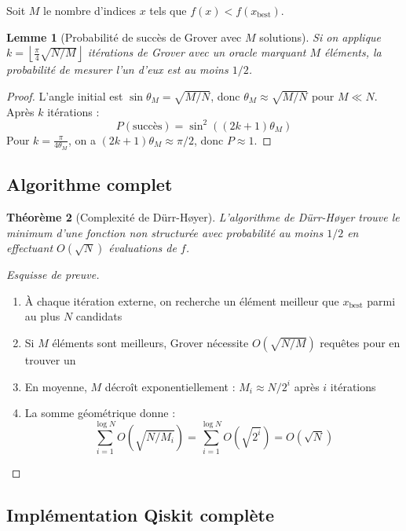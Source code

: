 \documentclass[12pt,a4paper]{article}
\newtheorem{theorem}{Théorème}[section]
\newtheorem{lemma}[theorem]{Lemme}
\theoremstyle{definition}
\theoremstyle{remark}
\begin{document}
Soit $M$ le nombre d'indices $x$ tels que $f(x) < f(x_{\text{best}})$.

\begin{lemma}[Probabilité de succès de Grover avec $M$ solutions]
Si on applique $k = \left\lfloor \frac{\pi}{4}\sqrt{N/M} \right\rfloor$ itérations de Grover avec un oracle marquant $M$ éléments, la probabilité de mesurer l'un d'eux est au moins $1/2$.
\end{lemma}

\begin{proof}
L'angle initial est $\sin\theta_M = \sqrt{M/N}$, donc $\theta_M \approx \sqrt{M/N}$ pour $M \ll N$. Après $k$ itérations :
\[
P(\text{succès}) = \sin^2((2k+1)\theta_M)
\]
Pour $k = \frac{\pi}{4\theta_M}$, on a $(2k+1)\theta_M \approx \pi/2$, donc $P \approx 1$.
\end{proof}

\subsection{Algorithme complet}

\begin{theorem}[Complexité de Dürr-Høyer]
L'algorithme de Dürr-Høyer trouve le minimum d'une fonction non structurée avec probabilité au moins $1/2$ en effectuant $O(\sqrt{N})$ évaluations de $f$.
\end{theorem}

\begin{proof}[Esquisse de preuve]
\begin{enumerate}
    \item À chaque itération externe, on recherche un élément meilleur que $x_{\text{best}}$ parmi au plus $N$ candidats
    \item Si $M$ éléments sont meilleurs, Grover nécessite $O(\sqrt{N/M})$ requêtes pour en trouver un
    \item En moyenne, $M$ décroît exponentiellement : $M_i \approx N/2^i$ après $i$ itérations
    \item La somme géométrique donne :
    \[
    \sum_{i=1}^{\log N} O\left(\sqrt{N/M_i}\right) = \sum_{i=1}^{\log N} O\left(\sqrt{2^i}\right) = O(\sqrt{N})
    \]
\end{enumerate}
\end{proof}

\subsection{Implémentation Qiskit complète}
\end{document}
